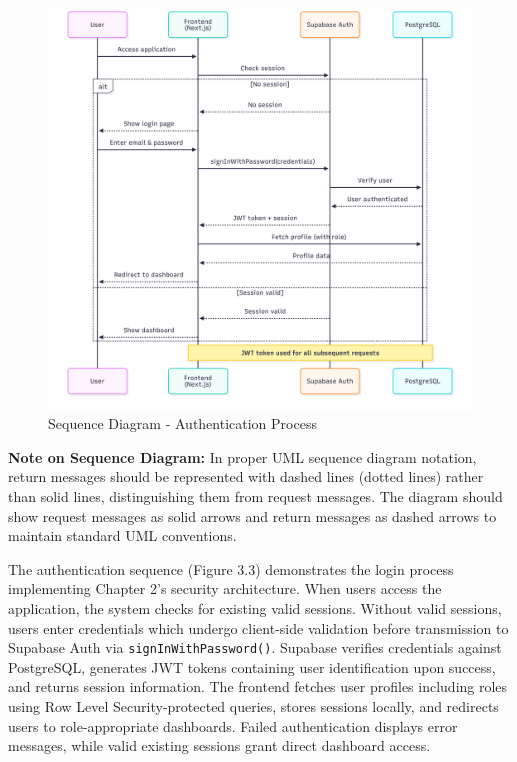 \begin{figure}[H]
    \centering
    \includegraphics[width=0.95\linewidth]{img/chap_03/sequence_authentication.png}
    \caption{Sequence Diagram - Authentication Process}
    \label{fig:sequence_authentication}
\end{figure}

\textbf{Note on Sequence Diagram:} In proper UML sequence diagram notation, return messages should be represented with dashed lines (dotted lines) rather than solid lines, distinguishing them from request messages. The diagram should show request messages as solid arrows and return messages as dashed arrows to maintain standard UML conventions.

The authentication sequence (Figure 3.3) demonstrates the login process implementing Chapter 2's security architecture. When users access the application, the system checks for existing valid sessions. Without valid sessions, users enter credentials which undergo client-side validation before transmission to Supabase Auth via \texttt{signInWithPassword()}. Supabase verifies credentials against PostgreSQL, generates JWT tokens containing user identification upon success, and returns session information. The frontend fetches user profiles including roles using Row Level Security-protected queries, stores sessions locally, and redirects users to role-appropriate dashboards. Failed authentication displays error messages, while valid existing sessions grant direct dashboard access.

